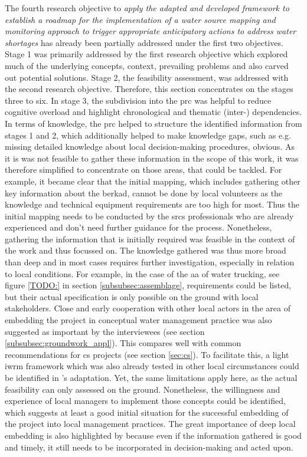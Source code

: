 The fourth research objective to \textit{apply the adapted and developed framework to establish a roadmap for the implementation of a water source mapping and monitoring approach to trigger appropriate anticipatory actions to address water shortages} has already been partially addressed under the first two objectives. Stage 1 was primarily addressed by the first research objective which explored much of the underlying concepts, context, prevailing problems and also carved out potential solutions. Stage 2, the feasibility assessment, was addressed with the second research objective. Therefore, this section concentrates on the stages three to six.\newline
In stage 3, the subdivision into the \acrshort{prc} was helpful to reduce cognitive overload and highlight chronological and thematic (inter-) dependencies. In terms of knowledge, the \acrshort{prc} helped to structure the identified information from stages 1 and 2, which additionally helped to make knowledge gaps, such as e.g. missing detailed knowledge about local decision-making procedures, obvious. As it is was not feasible to gather these information in the scope of this work, it was therefore simplified to concentrate on those areas, that could be tackled. For example, it became clear that the initial mapping, which includes gathering other key information about the berkad, cannot be done by local volunteers as the knowledge and technical equipment requirements are too high for most. Thus the initial mapping needs to be conducted by the \acrshort{srcs} professionals who are already experienced and don't need further guidance for the process. Nonetheless, gathering the information that is initially required was feasible in the context of the work and thus focussed on. The knowledge gathered was thus more broad than deep and in most cases requires further investigation, especially in relation to local conditions. For example, in the case of the \acrshort{aa} of water trucking, see figure \ref{TODO:} in section \ref{subsubsec:assemblage}, requirements could be listed, but their actual specification is only possible on the ground with local stakeholders.\newline
Close and early cooperation with other local actors in the area of embedding the project in conceptual water management practice was also suggested as important by the interviewees (see section \ref{subsubsec:groundwork_appl}). This compares well with common recommendations for \acrshort{cs} projects (see section \ref{sec:cs}). To facilitate this, a light \acrshort{iwrm} framework which was also already tested in other local circumstances could be identified in \autocite{dayCommunitybasedWaterResources2009}'s adaptation. Yet, the same limitations apply here, as the actual feasibility can only assessed on the ground. Nonetheless, the willingness and experience of local managers to implement those concepts could be identified, which suggests at least a good initial situation for the successful embedding of the project into local management practices. The great importance of deep local embedding is also highlighted by \autocite{gualazziniEWEAEarlyWarning2021} because even if the information gathered is good and timely, it still needs to be incorporated in decision-making and acted upon.\newline
